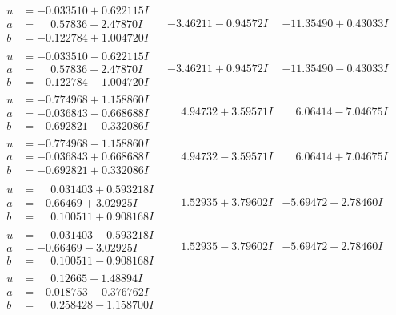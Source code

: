 \documentclass[1p]{elsarticle_modified}
\theoremstyle{definition}
\begin{document}
$$\begin{array}{c|c|c}
\begin{aligned}
u &= -0.033510 + 0.622115 I \\
a &= \phantom{-}0.57836 + 2.47870 I \\
b &= -0.122784 + 1.004720 I\end{aligned}
 & -3.46211 - 0.94572 I & -11.35490 + 0.43033 I \\ \hline\begin{aligned}
u &= -0.033510 - 0.622115 I \\
a &= \phantom{-}0.57836 - 2.47870 I \\
b &= -0.122784 - 1.004720 I\end{aligned}
 & -3.46211 + 0.94572 I & -11.35490 - 0.43033 I \\ \hline\begin{aligned}
u &= -0.774968 + 1.158860 I \\
a &= -0.036843 - 0.668688 I \\
b &= -0.692821 - 0.332086 I\end{aligned}
 & \phantom{-}4.94732 + 3.59571 I & \phantom{-}6.06414 - 7.04675 I \\ \hline\begin{aligned}
u &= -0.774968 - 1.158860 I \\
a &= -0.036843 + 0.668688 I \\
b &= -0.692821 + 0.332086 I\end{aligned}
 & \phantom{-}4.94732 - 3.59571 I & \phantom{-}6.06414 + 7.04675 I \\ \hline\begin{aligned}
u &= \phantom{-}0.031403 + 0.593218 I \\
a &= -0.66469 + 3.02925 I \\
b &= \phantom{-}0.100511 + 0.908168 I\end{aligned}
 & \phantom{-}1.52935 + 3.79602 I & -5.69472 - 2.78460 I \\ \hline\begin{aligned}
u &= \phantom{-}0.031403 - 0.593218 I \\
a &= -0.66469 - 3.02925 I \\
b &= \phantom{-}0.100511 - 0.908168 I\end{aligned}
 & \phantom{-}1.52935 - 3.79602 I & -5.69472 + 2.78460 I \\ \hline\begin{aligned}
u &= \phantom{-}0.12665 + 1.48894 I \\
a &= -0.018753 - 0.376762 I \\
b &= \phantom{-}0.258428 - 1.158700 I\end{aligned}

\end{array}$$
\end{document}
